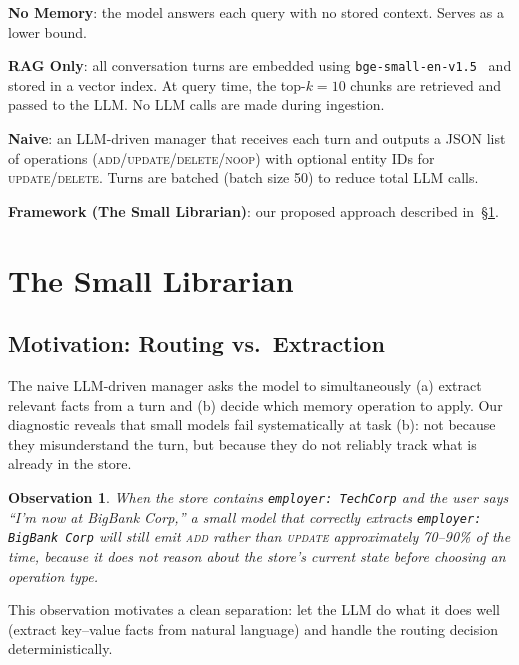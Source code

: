 \documentclass[10pt, twocolumn]{article}
\newtheorem{observation}{Observation}
\begin{document}
\textbf{No Memory}: the model answers each query with no stored context.
Serves as a lower bound.

\textbf{RAG Only}: all conversation turns are embedded using
\texttt{bge-small-en-v1.5}~\cite{bge2023} and stored in a vector
index.
At query time, the top-$k=10$ chunks are retrieved and passed to the
LLM.
No LLM calls are made during ingestion.

\textbf{Naive}: an LLM-driven manager that receives each turn and outputs
a JSON list of operations (\textsc{add}/\textsc{update}/\textsc{delete}/\textsc{noop})
with optional entity IDs for \textsc{update}/\textsc{delete}.
Turns are batched (batch size 50) to reduce total LLM calls.

\textbf{Framework (The Small Librarian)}: our proposed approach described
in~\S\ref{sec:framework}.

\section{The Small Librarian}
\label{sec:framework}

\subsection{Motivation: Routing vs.\ Extraction}

The naive LLM-driven manager asks the model to simultaneously (a) extract
relevant facts from a turn and (b) decide which memory operation to apply.
Our diagnostic reveals that small models fail systematically at task (b): not
because they misunderstand the turn, but because they do not reliably track
what is already in the store.

\begin{observation}
When the store contains \texttt{employer: TechCorp} and the user says
``I'm now at BigBank Corp,'' a small model that correctly extracts
\texttt{employer: BigBank Corp} will still emit \textsc{add} rather than
\textsc{update} approximately 70--90\% of the time, because it does not
reason about the store's current state before choosing an operation type.
\end{observation}

This observation motivates a clean separation: let the LLM do what it
does well (extract key--value facts from natural language) and handle
the routing decision deterministically.
\end{document}
